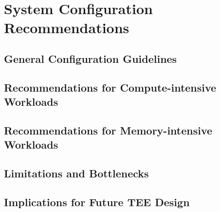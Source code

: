 \chapter{System Configuration Recommendations}
\label{chap:recommendations}

\section{General Configuration Guidelines}

\section{Recommendations for Compute-intensive Workloads}

\section{Recommendations for Memory-intensive Workloads}

\section{Limitations and Bottlenecks}

\section{Implications for Future TEE Design}